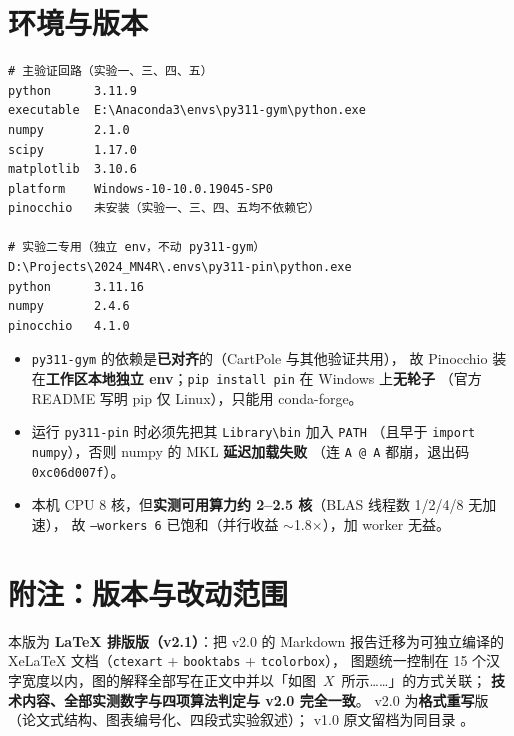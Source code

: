 \documentclass[11pt,a4paper]{ctexart}
\begin{document}
\section{环境与版本}\label{app:env}

{\footnotesize
\begin{verbatim}
# 主验证回路（实验一、三、四、五）
python      3.11.9
executable  E:\Anaconda3\envs\py311-gym\python.exe
numpy       2.1.0
scipy       1.17.0
matplotlib  3.10.6
platform    Windows-10-10.0.19045-SP0
pinocchio   未安装（实验一、三、四、五均不依赖它）

# 实验二专用（独立 env，不动 py311-gym）
D:\Projects\2024_MN4R\.envs\py311-pin\python.exe
python      3.11.16
numpy       2.4.6
pinocchio   4.1.0
\end{verbatim}
}

\begin{itemize}[leftmargin=1.6em,itemsep=3pt]
\item \texttt{py311-gym} 的依赖是\textbf{已对齐}的（CartPole 与其他验证共用），
  故 Pinocchio 装在\textbf{工作区本地独立 env}；\texttt{pip install pin} 在 Windows 上\textbf{无轮子}
  （官方 README 写明 pip 仅 Linux），只能用 conda-forge。
\item 运行 \texttt{py311-pin} 时必须先把其 \texttt{Library\textbackslash bin} 加入 \texttt{PATH}
  （且早于 \texttt{import numpy}），否则 numpy 的 MKL \textbf{延迟加载失败}
  （连 \texttt{A @ A} 都崩，退出码 \texttt{0xc06d007f}）。
\item 本机 CPU 8 核，但\textbf{实测可用算力约 2--2.5 核}（BLAS 线程数 1/2/4/8 无加速），
  故 \texttt{--workers 6} 已饱和（并行收益 $\sim$1.8$\times$），加 worker 无益。
\end{itemize}

\section*{附注：版本与改动范围}

本版为 \textbf{LaTeX 排版版（v2.1）}：把 v2.0 的 Markdown 报告迁移为可独立编译的
XeLaTeX 文档（\texttt{ctexart} + \texttt{booktabs} + \texttt{tcolorbox}），
图题统一控制在 15 个汉字宽度以内，图的解释全部写在正文中并以「如图~$X$~所示……」的方式关联；
\textbf{技术内容、全部实测数字与四项算法判定与 v2.0 完全一致}。
v2.0 为\textbf{格式重写}版（论文式结构、图表编号化、四段式实验叙述）；
v1.0 原文留档为同目录 。
\end{document}

